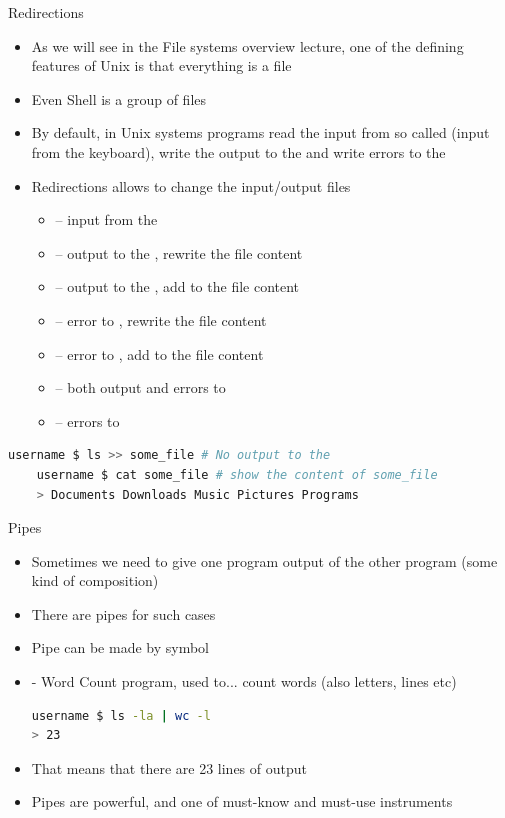 \documentclass[usenames,dvipsnames,10pt,aspectratio=169]{beamer}
\begin{document}
\begin{frame}[fragile]{Redirections}
    \begin{itemize}
        \item As we will see in the File systems overview lecture, one of the defining features of Unix is that everything is a file
        \item Even Shell is a group of files
        \item By default, in Unix systems programs read the input from so called  (input from the keyboard), write the output to the  and write errors to the 
        \item Redirections allows to change the input/output files
        \begin{itemize}
            \item {} -- input from the 
            \item {} -- output to the , rewrite the file content
            \item {} -- output to the , add to the file content
            \item {} -- error to , rewrite the file content
            \item {} -- error to , add to the file content
            \item {} -- both output and errors to 
            \item {} -- errors to 
        \end{itemize}
    \end{itemize}
    \begin{lstlisting}[language=Bash, style=shellstyle]
    username $ ls >> some_file # No output to the 
    username $ cat some_file # show the content of some_file
    > Documents Downloads Music Pictures Programs \end{lstlisting}
\end{frame}

\begin{frame}[fragile]{Pipes}
    \begin{itemize}
        \item Sometimes we need to give one program output of the other program (some kind of composition)
        \item There are pipes for such cases
        \item Pipe can be made by \ex{|} symbol
        \item {} - Word Count program, used to... count words (also letters, lines etc)
        \begin{lstlisting}[language=Bash, style=shellstyle] 
username $ ls -la | wc -l
> 23 
\end{lstlisting}
        \item That means that there are 23 lines of output
        \item Pipes are powerful, and one of must-know and must-use instruments
    \end{itemize}
\end{frame}
\end{document}
